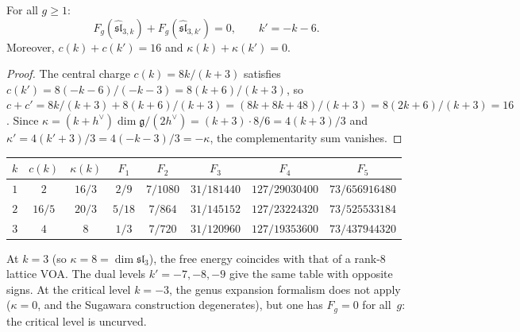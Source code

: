 \begin{proposition}%
\label{prop:sl3-complementarity-all-genera}
For all $g \geq 1$:
\begin{equation}\label{eq:sl3-complementarity-allgenera}
F_g(\widehat{\mathfrak{sl}}_{3,k}) + F_g(\widehat{\mathfrak{sl}}_{3,k'}) = 0,
\qquad k' = -k-6.
\end{equation}
Moreover, $c(k) + c(k') = 16$ and
$\kappa(k) + \kappa(k') = 0$.
\end{proposition}

\begin{proof}
The central charge $c(k) = 8k/(k+3)$ satisfies
$c(k') = 8(-k-6)/(-k-3) = 8(k+6)/(k+3)$, so
$c + c' = 8k/(k+3) + 8(k+6)/(k+3) = (8k + 8k + 48)/(k+3)
= 8(2k+6)/(k+3) = 16$.
Since $\kappa = (k+h^\vee)\dim\mathfrak{g}/(2h^\vee)
= (k+3) \cdot 8/6 = 4(k+3)/3$ and
$\kappa' = 4(k'+3)/3 = 4(-k-3)/3 = -\kappa$,
the complementarity sum vanishes.
\end{proof}

\begin{computation}\label{comp:sl3-multi-level}
\begin{center}
\renewcommand{\arraystretch}{1.3}
\begin{tabular}{cccccccc}
\toprule
$k$ & $c(k)$ & $\kappa(k)$ & $F_1$ & $F_2$ & $F_3$ & $F_4$ & $F_5$ \\
\midrule
$1$ & $2$ & $16/3$ & $2/9$ & $7/1080$ & $31/181440$ & $127/29030400$ & $73/656916480$ \\[3pt]
$2$ & $16/5$ & $20/3$ & $5/18$ & $7/864$ & $31/145152$ & $127/23224320$ & $73/525533184$ \\[3pt]
$3$ & $4$ & $8$ & $1/3$ & $7/720$ & $31/120960$ & $127/19353600$ & $73/437944320$ \\
\bottomrule
\end{tabular}
\end{center}

\noindent
At $k = 3$ (so $\kappa = 8 = \dim\mathfrak{sl}_3$), the free energy coincides
with that of a rank-$8$ lattice VOA.  The dual levels
$k' = -7, -8, -9$ give the same table with opposite signs.
At the critical level $k = -3$, the genus expansion formalism
does not apply ($\kappa = 0$, and the Sugawara construction
degenerates), but one has $F_g = 0$ for all~$g$: the critical
level is uncurved.
\end{computation}

